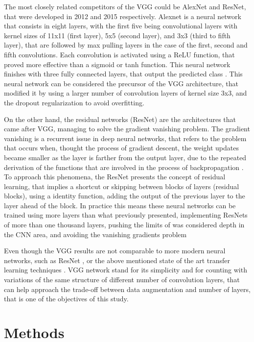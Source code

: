 \documentclass[10pt,twocolumn,letterpaper]{article}
\begin{document}
The most closely related competitors of the VGG could be AlexNet and ResNet, that were developed in 2012 and 2015 respectively. Alexnet is a neural network that consists in eight layers, with the first five being convolutional layers with kernel sizes of 11x11 (first layer), 5x5 (second layer), and 3x3 (third to fifth layer), that are followed by max pulling layers in the case of the first, second and fifth convolutions. Each convolution is activated using a ReLU function, that proved more effective than a sigmoid or tanh function. This neural network finishes with three fully connected layers, that output the predicted class \cite{Krizhevsky2012}. This neural network can be considered the precursor of the VGG architecture, that modified it by using a larger number of convolution layers of kernel size 3x3, and the dropout regularization to avoid overfitting.

On the other hand, the residual networks (ResNet) are the architectures that came after VGG, managing to solve the gradient vanishing problem. The gradient vanishing is a recurrent issue in deep neural networks, that refers to the problem that occurs when, thought the process of gradient descent, the weight updates became smaller as the layer is farther from the output layer, due to the repeated derivation of the functions that are involved in the process of backpropagation \cite{Aghdam2017,Skansi2018}. To approach this phenomena, the ResNet presents the concept of residual learning, that implies a shortcut or skipping between blocks of layers (residual blocks), using a identity function, adding the output of the previous layer to the layer ahead of the block. In practice this means these neural networks can be trained using more layers than what previously presented, implementing ResNets of more than one thousand  layers, pushing the limits of was considered depth in the CNN area, and avoiding the vanishing gradients problem \cite{He2016,He2016a}

Even though the VGG results are not comparable to more modern neural networks, such as ResNet \cite{He2016}, or the above mentioned state of the art transfer learning techniques \cite{Kolesnikov2019}. VGG network stand for its simplicity and for counting with variations of the same structure of different number of convolution layers, that can help approach the trade-off between data augmentation and number of layers, that is one of the objectives of this study.

\section{Methods}
\end{document}
